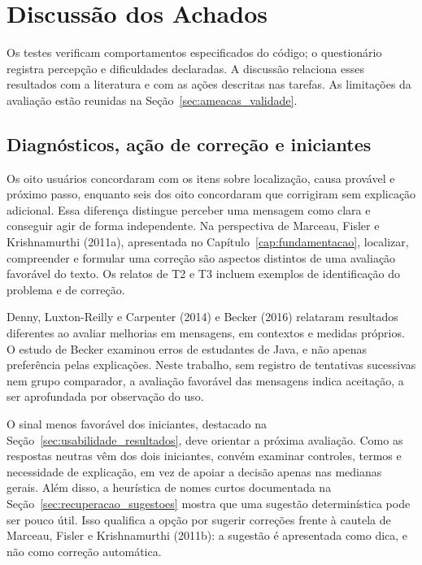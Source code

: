 \section{Discussão dos Achados}
\label{sec:discussao_resultados}

Os testes verificam comportamentos especificados do código; o questionário
registra percepção e dificuldades declaradas. A discussão relaciona esses
resultados com a literatura e com as ações descritas nas tarefas. As limitações da
avaliação estão reunidas na Seção~\ref{sec:ameacas_validade}.

\subsection{Diagnósticos, ação de correção e iniciantes}

Os oito usuários concordaram com os itens sobre localização, causa provável e
próximo passo, enquanto seis dos oito concordaram que corrigiram sem explicação
adicional. Essa diferença distingue perceber uma mensagem como clara e conseguir
agir de forma independente. Na perspectiva de Marceau, Fisler e Krishnamurthi
(2011a), apresentada no Capítulo~\ref{cap:fundamentacao}, localizar, compreender e
formular uma correção são aspectos distintos de uma avaliação favorável do texto. Os relatos de T2 e T3 incluem exemplos de identificação do problema e de correção.

Denny, Luxton-Reilly e Carpenter (2014) e Becker (2016) relataram resultados
diferentes ao avaliar melhorias em mensagens, em contextos e medidas próprios.
O estudo de Becker examinou erros de estudantes de Java, e não apenas preferência
pelas explicações. Neste trabalho, sem registro de tentativas sucessivas nem grupo comparador, a avaliação favorável das mensagens indica aceitação, a ser aprofundada por observação do uso.

O sinal menos favorável dos iniciantes, destacado na
Seção~\ref{sec:usabilidade_resultados}, deve orientar a próxima avaliação. Como as respostas neutras vêm dos dois iniciantes, convém examinar controles, termos e necessidade de explicação, em vez de apoiar a decisão apenas nas medianas gerais. Além disso, a heurística de nomes
curtos documentada na Seção~\ref{sec:recuperacao_sugestoes} mostra que uma sugestão
determinística pode ser pouco útil. Isso qualifica a opção por sugerir correções
frente à cautela de Marceau, Fisler e Krishnamurthi (2011b): a sugestão é apresentada como dica, e não como correção automática.

